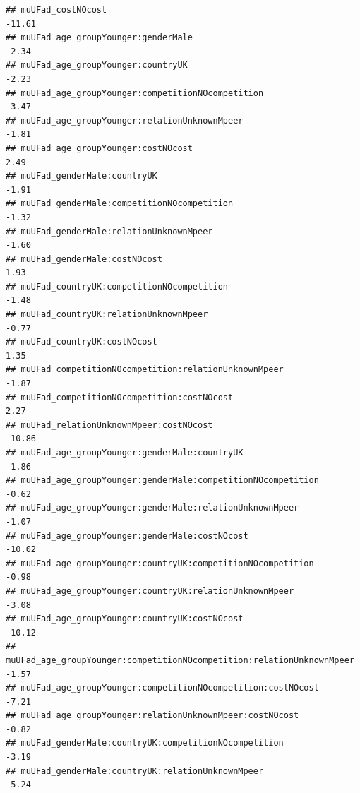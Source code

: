 \documentclass[
]{article}
\begin{document}
\begin{verbatim}
## muUFad_costNOcost                                                                   -11.61
## muUFad_age_groupYounger:genderMale                                                   -2.34
## muUFad_age_groupYounger:countryUK                                                    -2.23
## muUFad_age_groupYounger:competitionNOcompetition                                     -3.47
## muUFad_age_groupYounger:relationUnknownMpeer                                         -1.81
## muUFad_age_groupYounger:costNOcost                                                    2.49
## muUFad_genderMale:countryUK                                                          -1.91
## muUFad_genderMale:competitionNOcompetition                                           -1.32
## muUFad_genderMale:relationUnknownMpeer                                               -1.60
## muUFad_genderMale:costNOcost                                                          1.93
## muUFad_countryUK:competitionNOcompetition                                            -1.48
## muUFad_countryUK:relationUnknownMpeer                                                -0.77
## muUFad_countryUK:costNOcost                                                           1.35
## muUFad_competitionNOcompetition:relationUnknownMpeer                                 -1.87
## muUFad_competitionNOcompetition:costNOcost                                            2.27
## muUFad_relationUnknownMpeer:costNOcost                                              -10.86
## muUFad_age_groupYounger:genderMale:countryUK                                         -1.86
## muUFad_age_groupYounger:genderMale:competitionNOcompetition                          -0.62
## muUFad_age_groupYounger:genderMale:relationUnknownMpeer                              -1.07
## muUFad_age_groupYounger:genderMale:costNOcost                                       -10.02
## muUFad_age_groupYounger:countryUK:competitionNOcompetition                           -0.98
## muUFad_age_groupYounger:countryUK:relationUnknownMpeer                               -3.08
## muUFad_age_groupYounger:countryUK:costNOcost                                        -10.12
## muUFad_age_groupYounger:competitionNOcompetition:relationUnknownMpeer                -1.57
## muUFad_age_groupYounger:competitionNOcompetition:costNOcost                          -7.21
## muUFad_age_groupYounger:relationUnknownMpeer:costNOcost                              -0.82
## muUFad_genderMale:countryUK:competitionNOcompetition                                 -3.19
## muUFad_genderMale:countryUK:relationUnknownMpeer                                     -5.24

\end{verbatim}
\end{document}

